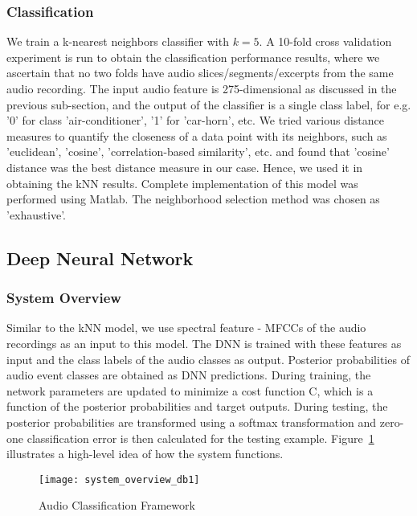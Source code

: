 \subsubsection{Classification}
We train a k-nearest neighbors classifier with $k=5$. A 10-fold cross validation experiment is run to obtain the classification performance results, where we ascertain that no two folds have audio slices/segments/excerpts from the same audio recording. The input audio feature is 275-dimensional as discussed in the previous sub-section, and the output of the classifier is a single class label, for e.g. '0' for class 'air-conditioner', '1' for 'car-horn', etc. We tried various distance measures to quantify the closeness of a data point with its neighbors, such as 'euclidean', 'cosine', 'correlation-based similarity', etc. and found that 'cosine' distance was the best distance measure in our case. Hence, we used it in obtaining the kNN results. Complete implementation of this model was performed using Matlab. The neighborhood selection method was chosen as 'exhaustive'.

\subsection{Deep Neural Network}

\subsubsection{System Overview}
Similar to the kNN model, we use spectral feature - MFCCs of the audio recordings as an input to this model. The DNN is trained with these features as input and the class labels of the audio classes as output. Posterior probabilities of audio event classes are obtained as DNN predictions. During training, the network parameters are updated to minimize a cost function C, which is a function of the posterior probabilities and target outputs. During testing, the posterior probabilities are transformed using a softmax transformation and zero-one classification error is then calculated for the testing example. Figure~\ref{fig:system_overview_db1} illustrates a high-level idea of how the system functions.

\begin{figure}[!htb] 
\centering 
\texttt{[image: system\_overview\_db1]}
\caption[Audio Classification Framework]{Audio Classification Framework}
\label{fig:system_overview_db1} 
\end{figure}

